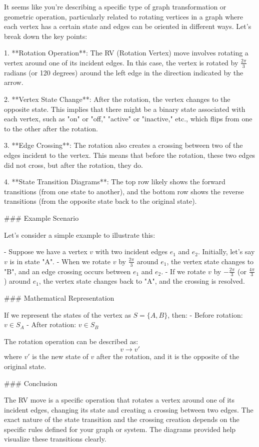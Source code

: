 It seems like you're describing a specific type of graph transformation or geometric operation, particularly related to rotating vertices in a graph where each vertex has a certain state and edges can be oriented in different ways. Let's break down the key points:

1. **Rotation Operation**: The RV (Rotation Vertex) move involves rotating a vertex around one of its incident edges. In this case, the vertex is rotated by \( \frac{2\pi}{3} \) radians (or 120 degrees) around the left edge in the direction indicated by the arrow.

2. **Vertex State Change**: After the rotation, the vertex changes to the opposite state. This implies that there might be a binary state associated with each vertex, such as "on" or "off," "active" or "inactive," etc., which flips from one to the other after the rotation.

3. **Edge Crossing**: The rotation also creates a crossing between two of the edges incident to the vertex. This means that before the rotation, these two edges did not cross, but after the rotation, they do.

4. **State Transition Diagrams**: The top row likely shows the forward transitions (from one state to another), and the bottom row shows the reverse transitions (from the opposite state back to the original state).

### Example Scenario

Let's consider a simple example to illustrate this:

- Suppose we have a vertex \( v \) with two incident edges \( e_1 \) and \( e_2 \). Initially, let's say \( v \) is in state "A".
- When we rotate \( v \) by \( \frac{2\pi}{3} \) around \( e_1 \), the vertex state changes to "B", and an edge crossing occurs between \( e_1 \) and \( e_2 \).
- If we rotate \( v \) by \( -\frac{2\pi}{3} \) (or \( \frac{4\pi}{3} \)) around \( e_1 \), the vertex state changes back to "A", and the crossing is resolved.

### Mathematical Representation

If we represent the states of the vertex as \( S = \{ A, B \} \), then:
- Before rotation: \( v \in S_A \)
- After rotation: \( v \in S_B \)

The rotation operation can be described as:
\[ v \rightarrow v' \]
where \( v' \) is the new state of \( v \) after the rotation, and it is the opposite of the original state.

### Conclusion

The RV move is a specific operation that rotates a vertex around one of its incident edges, changing its state and creating a crossing between two edges. The exact nature of the state transition and the crossing creation depends on the specific rules defined for your graph or system. The diagrams provided help visualize these transitions clearly.